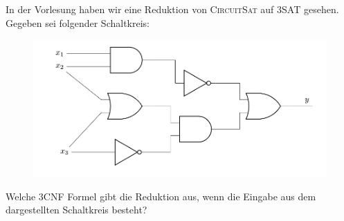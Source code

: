 \documentclass{uebung_cs}
\begin{document}
\begin{aufgabe}[Schaltkreise]
	In der Vorlesung haben wir eine Reduktion von \textsc{CircuitSat} auf \textsc{3SAT} gesehen. Gegeben sei folgender Schaltkreis:
	
	\begin{figure}[ht]
		\begin{center}
			\includegraphics[scale=0.5]{schaltkreis}
		\end{center}
	\end{figure}
		
	
	Welche \textsc{3CNF} Formel gibt die Reduktion aus, wenn die Eingabe aus dem dargestellten Schaltkreis besteht?\\
\end{aufgabe}
\end{document}
